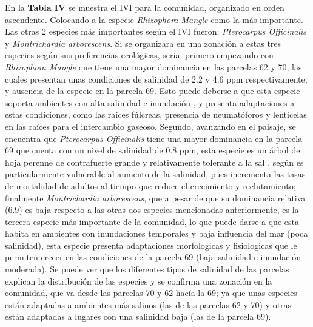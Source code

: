 \documentclass[conference,final,12pt,]{IEEEtran}
\begin{document}
En la \textbf{Tabla IV} se muestra el IVI para la comunidad, 
organizado en orden ascendente. Colocando a la especie \emph{Rhizophora Mangle} como la más importante. Las otras
2 especies más importantes según el IVI fueron: \emph{Pterocarpus
Officinalis} y \emph{Montrichardia arborescens}. Si se organizara en una
zonación a estas tres especies según sus preferencias ecológicas, seria:
primero empezando con \emph{Rhizophora Mangle} que tiene una mayor
dominancia en las parcelas 62 y 70, las cuales presentan unas
condiciones de salinidad de 2.2 y 4.6 ppm respectivamente, y ausencia
de la especie en la parcela 69. Esto puede deberse a que esta especie
soporta ambientes con alta salinidad e inundación \citep{AF}, y presenta
adaptaciones a estas condiciones, como las raíces fúlcreas, presencia de
neumatóforos \citep{AF} y lenticelas en las raíces para el intercambio
gaseoso. Segundo, avanzando en el paisaje, se encuentra que
\emph{Pterocarpus Officinalis} tiene una mayor dominancia en la parcela
69 que cuenta con un nivel de salinidad de 0.8 ppm, esta especie es un
árbol de hoja perenne de contrafuerte grande y relativamente tolerante a
la sal \citep{AG}, según \citep{AH} es particularmente vulnerable al
aumento de la salinidad, pues incrementa las tasas de mortalidad de
adultos al tiempo que reduce el crecimiento y reclutamiento;
finalmente \emph{Montrichardia arborescens}, que a pesar de que su
dominancia relativa (6.9) es baja respecto a las otras dos especies
mencionadas anteriormente, es la tercera especie más importante de la
comunidad, lo que puede darse a que esta habita en ambientes con
inundaciones temporales y baja influencia del mar (poca salinidad), esta especie presenta adaptaciones
morfologicas y fisiologicas que le permiten crecer en las condiciones de
la parcela 69 \citep{AI} (baja salinidad e inundación moderada). Se puede ver que los diferentes tipos de salinidad de las parcelas explican la
distribución de las especies y se confirma una zonación en la comunidad,
que va desde las parcelas 70 y 62 hacía la 69; ya que unas especies están
adaptadas a ambientes más salinos (las de las parcelas 62 y 70) y otras
están adaptadas a lugares con una salinidad baja (las de la parcela 69).
\end{document}
